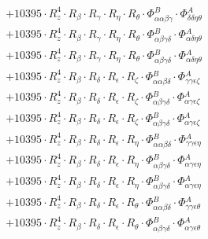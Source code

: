 \documentclass{article}
\begin{document}
\begin{subequations}
\begin{gather}
\begin{array}{c}
 \\[0.2em] 		 + 10395 \cdot R_{z}^{4} \cdot R_{\beta{}} \cdot R_{\gamma{}} \cdot R_{\eta{}} \cdot R_{\theta{}} \cdot \Phi{}^{B}_{\alpha{}\alpha{}\beta{}\gamma{}} \cdot \Phi{}^{A}_{\delta{}\delta{}\eta{}\theta{}} 
 \\[0.2em] 		 + 10395 \cdot R_{z}^{4} \cdot R_{\beta{}} \cdot R_{\gamma{}} \cdot R_{\eta{}} \cdot R_{\theta{}} \cdot \Phi{}^{B}_{\alpha{}\beta{}\gamma{}\delta{}} \cdot \Phi{}^{A}_{\alpha{}\delta{}\eta{}\theta{}} 
 \\[0.2em] 		 + 10395 \cdot R_{z}^{4} \cdot R_{\beta{}} \cdot R_{\gamma{}} \cdot R_{\eta{}} \cdot R_{\theta{}} \cdot \Phi{}^{B}_{\alpha{}\beta{}\gamma{}\delta{}} \cdot \Phi{}^{A}_{\alpha{}\delta{}\eta{}\theta{}} 
 \\[0.2em] 		 + 10395 \cdot R_{z}^{4} \cdot R_{\beta{}} \cdot R_{\delta{}} \cdot R_{\epsilon{}} \cdot R_{\zeta{}} \cdot \Phi{}^{B}_{\alpha{}\alpha{}\beta{}\delta{}} \cdot \Phi{}^{A}_{\gamma{}\gamma{}\epsilon{}\zeta{}} 
 \\[0.2em] 		 + 10395 \cdot R_{z}^{4} \cdot R_{\beta{}} \cdot R_{\delta{}} \cdot R_{\epsilon{}} \cdot R_{\zeta{}} \cdot \Phi{}^{B}_{\alpha{}\beta{}\gamma{}\delta{}} \cdot \Phi{}^{A}_{\alpha{}\gamma{}\epsilon{}\zeta{}} 
 \\[0.2em] 		 + 10395 \cdot R_{z}^{4} \cdot R_{\beta{}} \cdot R_{\delta{}} \cdot R_{\epsilon{}} \cdot R_{\zeta{}} \cdot \Phi{}^{B}_{\alpha{}\beta{}\gamma{}\delta{}} \cdot \Phi{}^{A}_{\alpha{}\gamma{}\epsilon{}\zeta{}} 
 \\[0.2em] 		 + 10395 \cdot R_{z}^{4} \cdot R_{\beta{}} \cdot R_{\delta{}} \cdot R_{\epsilon{}} \cdot R_{\eta{}} \cdot \Phi{}^{B}_{\alpha{}\alpha{}\beta{}\delta{}} \cdot \Phi{}^{A}_{\gamma{}\gamma{}\epsilon{}\eta{}} 
 \\[0.2em] 		 + 10395 \cdot R_{z}^{4} \cdot R_{\beta{}} \cdot R_{\delta{}} \cdot R_{\epsilon{}} \cdot R_{\eta{}} \cdot \Phi{}^{B}_{\alpha{}\beta{}\gamma{}\delta{}} \cdot \Phi{}^{A}_{\alpha{}\gamma{}\epsilon{}\eta{}} 
 \\[0.2em] 		 + 10395 \cdot R_{z}^{4} \cdot R_{\beta{}} \cdot R_{\delta{}} \cdot R_{\epsilon{}} \cdot R_{\eta{}} \cdot \Phi{}^{B}_{\alpha{}\beta{}\gamma{}\delta{}} \cdot \Phi{}^{A}_{\alpha{}\gamma{}\epsilon{}\eta{}} 
 \\[0.2em] 		 + 10395 \cdot R_{z}^{4} \cdot R_{\beta{}} \cdot R_{\delta{}} \cdot R_{\epsilon{}} \cdot R_{\theta{}} \cdot \Phi{}^{B}_{\alpha{}\alpha{}\beta{}\delta{}} \cdot \Phi{}^{A}_{\gamma{}\gamma{}\epsilon{}\theta{}} 
 \\[0.2em] 		 + 10395 \cdot R_{z}^{4} \cdot R_{\beta{}} \cdot R_{\delta{}} \cdot R_{\epsilon{}} \cdot R_{\theta{}} \cdot \Phi{}^{B}_{\alpha{}\beta{}\gamma{}\delta{}} \cdot \Phi{}^{A}_{\alpha{}\gamma{}\epsilon{}\theta{}} 

\end{array}
\end{gather}
\end{subequations}
\end{document}
